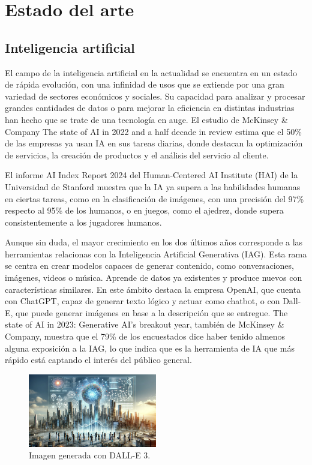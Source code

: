 \chapter{Estado del arte}
\label{ch:estado-arte}

\section{Inteligencia artificial}

El campo de la inteligencia artificial en la actualidad se encuentra en un estado de rápida evolución, con una infinidad de usos que se extiende por una gran variedad de sectores económicos y sociales. Su capacidad para analizar y procesar grandes cantidades de datos o para mejorar la eficiencia en distintas industrias han hecho que se trate de una tecnología en auge. El estudio de McKinsey \& Company The state of AI in 2022 and a half decade in review estima que el 50\% de las empresas ya usan IA en sus tareas diarias, donde destacan la optimización de servicios, la creación de productos y el análisis del servicio al cliente.

El informe AI Index Report 2024 del Human-Centered AI Institute (HAI) de la Universidad de Stanford muestra que la IA ya supera a las habilidades humanas en ciertas tareas, como en la clasificación de imágenes, con una precisión del 97\% respecto al 95\% de los humanos, o en juegos, como el ajedrez, donde supera consistentemente a los jugadores humanos.

Aunque sin duda, el mayor crecimiento en los dos últimos años corresponde a las herramientas relacionas con la Inteligencia Artificial Generativa (IAG). Esta rama se centra en crear modelos capaces de generar contenido, como conversaciones, imágenes, videos o música. Aprende de datos ya existentes y produce nuevos con características similares. En este ámbito destaca la empresa OpenAI, que cuenta con ChatGPT, capaz de generar texto lógico y actuar como chatbot, o con Dall-E, que puede generar imágenes en base a la descripción que se entregue. The state of AI in 2023: Generative AI's breakout year, también de McKinsey \& Company, muestra que el 79\% de los encuestados dice haber tenido almenos alguna exposición a la IAG, lo que indica que es la herramienta de IA que más rápido está captando el interés del público general.

\begin{figure}[H]
    \centering
    \includegraphics[width=0.5\textwidth]{figures/dall-e.png}
    \caption{Imagen generada con DALL-E 3.}
    \label{fig:dall-e}
\end{figure}


